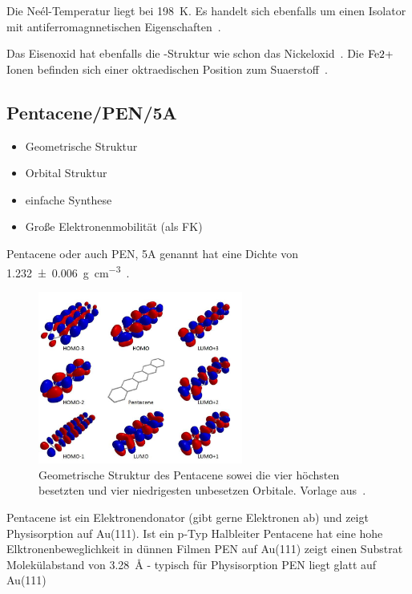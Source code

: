             Die Neél-Temperatur liegt bei \SI{198}{\kelvin}.
            Es handelt sich ebenfalls um einen Isolator mit antiferromagnnetischen Eigenschaften~\cite{FeO_4}.

            Das Eisenoxid hat ebenfalls die -Struktur wie schon das Nickeloxid~\cite{FeO_4}.
            Die $\ce{Fe{2+}}$ Ionen befinden sich einer oktraedischen Position zum Suaerstoff~\cite{FeO_4}.

        \subsection{Pentacene/PEN/5A}
            \begin{itemize}
                \item Geometrische Struktur
                \item Orbital Struktur
                \item einfache Synthese
                \item Große Elektronenmobilität (als FK)
            \end{itemize}
            Pentacene oder auch PEN, 5A genannt hat eine Dichte von \SI{1.232(6)}{\gram\per\cubic\centi\meter}~\cite{CAS}.

            \begin{figure}
                \centering
                \includegraphics[width=0.6\textwidth]{./content/PEN.jpg}
                \caption{Geometrische Struktur des Pentacene sowei die vier höchsten besetzten und vier niedrigesten unbesetzen Orbitale. Vorlage aus~\cite{PEN}.}
                \label{fig:PEN}
            \end{figure}

            \textbf{\cite{5A_1}}
            Pentacene ist ein Elektronendonator (gibt gerne Elektronen ab) und zeigt Physisorption auf Au(111).
            Ist ein p-Typ Halbleiter
            Pentacene hat eine hohe Elktronenbeweglichkeit in dünnen Filmen
            PEN auf Au(111) zeigt einen Substrat Molekülabstand von \SI{3.28}{\angstrom} - typisch für Physisorption
            PEN liegt glatt auf Au(111)
    